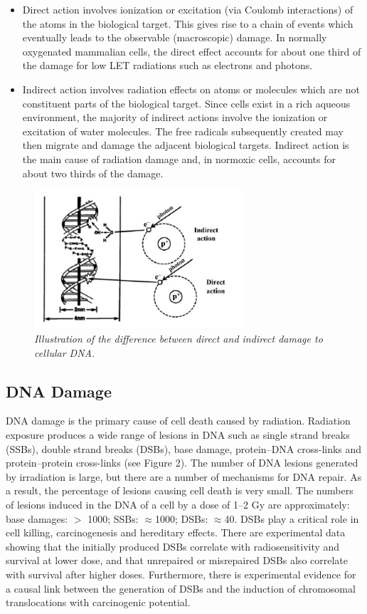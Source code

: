 \documentclass{article}
\begin{document}
\begin{itemize}
    \item Direct action involves ionization or excitation (via Coulomb interactions) of
the atoms in the biological target. This gives rise to a chain of events which
eventually leads to the observable (macroscopic) damage. In normally
oxygenated mammalian cells, the direct effect accounts for about one third
of the damage for low LET radiations such as electrons and photons.
\item Indirect action involves radiation effects on atoms or molecules which
are not constituent parts of the biological target. Since cells exist in a rich
aqueous environment, the majority of indirect actions involve the ionization
or excitation of water molecules. The free radicals subsequently created
may then migrate and damage the adjacent biological targets. Indirect action
is the main cause of radiation damage and, in normoxic cells, accounts for
about two thirds of the damage.
\end{itemize}

\begin{figure}[htp]
    \centering
    \includegraphics[width=7.8cm]{image_1}
    \caption{\textit{Illustration of the difference between direct and indirect damage to cellular DNA.}}
\end{figure}

\subsection*{DNA Damage}
DNA damage is the primary cause of cell death caused by radiation.
Radiation exposure produces a wide range of lesions in DNA such as single
strand breaks (SSBs), double strand breaks (DSBs), base damage, protein–DNA
cross-links and protein–protein cross-links (see Figure 2). The number of DNA
lesions generated by irradiation is large, but there are a number of mechanisms
for DNA repair. As a result, the percentage of lesions causing cell death is very
small. The numbers of lesions induced in the DNA of a cell by a dose of 1–2 Gy
are approximately: base damages: $>$ 1000; SSBs: $\approx$1000; DSBs: $\approx$40. DSBs play
a critical role in cell killing, carcinogenesis and hereditary effects. There are
experimental data showing that the initially produced DSBs correlate with
radiosensitivity and survival at lower dose, and that unrepaired or misrepaired
DSBs also correlate with survival after higher doses. Furthermore, there is
experimental evidence for a causal link between the generation of DSBs and the
induction of chromosomal translocations with carcinogenic potential.
\end{document}

